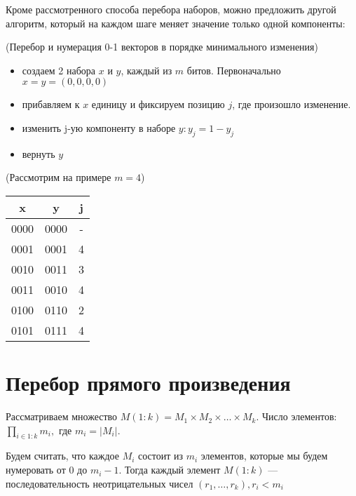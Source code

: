 Кроме рассмотренного способа перебора наборов, можно предложить другой алгоритм, который на каждом шаге меняет значение только одной компоненты:

\begin{algoritm} (Перебор и нумерация 0-1 векторов в порядке минимального изменения)
    
    \begin{itemize}
        \item создаем 2 набора $x$ и $y$, каждый из $m$ битов. Первоначально $x = y = (0, 0, 0, 0)$
        \item прибавляем к $x$ единицу и фиксируем позицию $j$, где произошло изменение.
        \item изменить j-ую компоненту в наборе $y: y_j = 1 - y_j$
        \item вернуть $y$ 
    \end{itemize}

\end{algoritm}

\begin{eg} (Рассмотрим на примере $m = 4$)
    
    \begin{tabular}{|c|c|c|}
        \hline
        x & y & j \\
        \hline
        0000 & 0000 & - \\
        \hline
        0001 & 0001 & 4 \\
        \hline
        0010 & 0011 & 3 \\
        \hline
        0011 & 0010 & 4 \\
        \hline
        0100 & 0110 & 2 \\
        \hline
        0101 & 0111 & 4 \\
        \hline
        
      \end{tabular}
\end{eg}

\section{Перебор прямого произведения}

Рассматриваем множество $M(1:k) = M_1 \times M_2 \times \ldots \times M_k$. Число элементов: $\prod_{i\in1:k} m_i,$ где $m_i = |M_i|$.

Будем считать, что каждое $M_i$ состоит из $m_i$ элементов, которые мы будем нумеровать от 0 до $m_i - 1$. Тогда каждый элемент $M(1:k)$ --- последовательность неотрицательных чисел $(r_1, \ldots, r_k), r_i < m_i$

